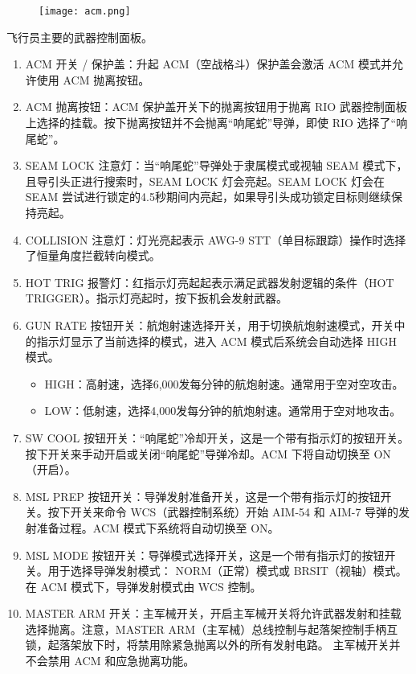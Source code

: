 \begin{figure}[htb]
	\centering
	\texttt{[image: acm.png]}
\end{figure}
飞行员主要的武器控制面板。

\begin{enumerate}
	\item ACM 开关 / 保护盖：升起 ACM（空战格斗）保护盖会激活 ACM 模式并允许使用 ACM 抛离按钮。
	\item ACM 抛离按钮：ACM 保护盖开关下的抛离按钮用于抛离 RIO 武器控制面板上选择的挂载。按下抛离按钮并不会抛离“响尾蛇”导弹，即使 RIO 选择了“响尾蛇”。
	\item SEAM LOCK 注意灯：当“响尾蛇”导弹处于隶属模式或视轴 SEAM 模式下，且导引头正进行搜索时，SEAM LOCK 灯会亮起。SEAM LOCK 灯会在 SEAM 尝试进行锁定的4.5秒期间内亮起，如果导引头成功锁定目标则继续保持亮起。
	\item COLLISION 注意灯：灯光亮起表示 AWG-9 STT（单目标跟踪）操作时选择了恒量角度拦截转向模式。
	\item HOT TRIG 报警灯：红指示灯亮起起表示满足武器发射逻辑的条件（HOT TRIGGER）。指示灯亮起时，按下扳机会发射武器。
	\item GUN RATE 按钮开关：航炮射速选择开关，用于切换航炮射速模式，开关中的指示灯显示了当前选择的模式，进入 ACM 模式后系统会自动选择 HIGH 模式。
	      \begin{itemize}
		      \item HIGH：高射速，选择6,000发每分钟的航炮射速。通常用于空对空攻击。
		      \item LOW：低射速，选择4,000发每分钟的航炮射速。通常用于空对地攻击。
	      \end{itemize}
	\item SW COOL 按钮开关：“响尾蛇”冷却开关，这是一个带有指示灯的按钮开关。按下开关来手动开启或关闭“响尾蛇”导弹冷却。ACM 下将自动切换至 ON（开启）。
	\item MSL PREP 按钮开关：导弹发射准备开关，这是一个带有指示灯的按钮开关。按下开关来命令 WCS（武器控制系统）开始 AIM-54 和 AIM-7 导弹的发射准备过程。ACM 模式下系统将自动切换至 ON。
	\item MSL MODE 按钮开关：导弹模式选择开关，这是一个带有指示灯的按钮开关。用于选择导弹发射模式： NORM（正常）模式或 BRSIT（视轴）模式。在 ACM 模式下，导弹发射模式由 WCS 控制。
	\item MASTER ARM 开关：主军械开关，开启主军械开关将允许武器发射和挂载选择抛离。注意，MASTER ARM（主军械）总线控制与起落架控制手柄互锁，起落架放下时，将禁用除紧急抛离以外的所有发射电路。	主军械开关并不会禁用 ACM 和应急抛离功能。
	      \begin{itemize}

\end{itemize}
\end{enumerate}
